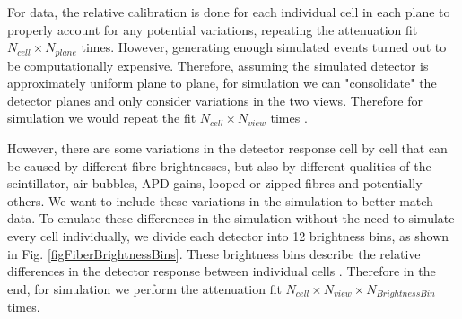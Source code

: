 For data, the relative calibration is done for each individual cell in each plane to properly account for any potential variations, repeating the attenuation fit $N_{cell}\times N_{plane}$ times. However, generating enough simulated events turned out to be computationally expensive. Therefore, assuming the simulated detector is approximately uniform plane to plane, for simulation we can "consolidate" the detector planes and only consider variations in the two views. Therefore for simulation we would repeat the fit $N_{cell}\times N_{view}$ times \cite{NOVA-doc-13579-SAAttenuationAndThreshold,NOVA-doc-34909}.

However, there are some variations in the detector response cell by cell that can be caused by different fibre brightnesses, but also by different qualities of the scintillator, air bubbles, APD gains, looped or zipped fibres and potentially others. We want to include these variations in the simulation to better match data. To emulate these differences in the simulation without the need to simulate every cell individually, we divide each detector into 12 brightness bins, as shown in Fig. \ref{figFiberBrightnessBins}. These brightness bins describe the relative differences in the detector response between individual cells \cite{NOVA-doc-34909}. Therefore in the end, for simulation we perform the attenuation fit $N_{cell}\times N_{view}\times N_{BrightnessBin}$ times.


